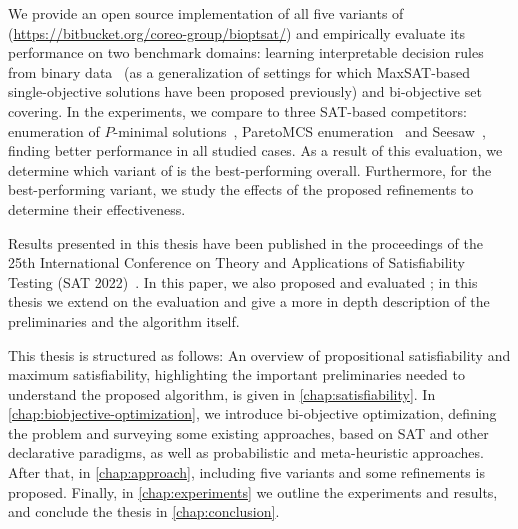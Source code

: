 We provide an open source implementation of all five variants of \algname{} ({\small\url{https://bitbucket.org/coreo-group/bioptsat/}}) and empirically evaluate its performance on two benchmark domains:
learning interpretable decision rules from binary data~\autocite{DBLP:conf/cp/MaliotovM18} (as a generalization of settings for which MaxSAT-based single-objective solutions have been proposed previously) and bi-objective set covering.
In the experiments, we compare \algname{} to three SAT-based competitors:
enumeration of $P$-minimal solutions~\autocite{DBLP:conf/cp/SohBTB17}, ParetoMCS enumeration~\autocite{DBLP:conf/ijcai/Terra-NevesLM18a} and Seesaw~\autocite{DBLP:conf/cp/JanotaMSM21}, finding better performance in all studied cases.
As a result of this evaluation, we determine which variant of \algname{} is the best-performing overall.
Furthermore, for the best-performing variant, we study the effects of the proposed refinements to determine their effectiveness.

Results presented in this thesis have been published in the proceedings of the 25th International Conference on Theory and Applications of Satisfiability Testing (SAT 2022)~\autocite{JabsEtAl2022MaxSATBasedBi}.
In this paper, we also proposed and evaluated \algname{};
in this thesis we extend on the evaluation and give a more in depth description of the preliminaries and the algorithm itself.

This thesis is structured as follows:
An overview of propositional satisfiability and maximum satisfiability, highlighting the important preliminaries needed to understand the proposed algorithm, is given in \cref{chap:satisfiability}.
In \cref{chap:biobjective-optimization}, we introduce bi-objective optimization, defining the problem and surveying some existing approaches, based on SAT and other declarative paradigms, as well as probabilistic and meta-heuristic approaches.
After that, in \cref{chap:approach}, \algname{} including five variants and some refinements is proposed.
Finally, in \cref{chap:experiments} we outline the experiments and results, and conclude the thesis in \cref{chap:conclusion}.